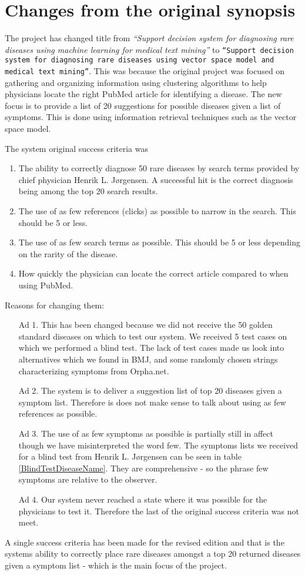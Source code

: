 \chapter*{Changes from the original synopsis}

The project has changed title from \textit{``Support decision system
  for diagnosing rare diseases using machine learning for medical text
  mining''} to \texttt{``Support decision system for diagnosing rare
  diseases using vector space model and \\ medical text
  mining''}. This was because the original project was focused on
gathering and organizing information using clustering algorithms to
help physicians locate the right PubMed article for identifying a
disease. The new focus is to provide a list of 20 suggestions for
possible diseases given a list of symptoms. This is done using
information retrieval techniques such as the vector space model.

The system original success criteria was
\begin{enumerate}
\item The ability to correctly diagnose 50 rare diseases by search
  terms provided by chief physician Henrik L. J\o rgensen. A
  successful hit is the correct diagnosis being among the top 20
  search results.
\item The use of as few references (clicks) as possible to narrow in
  the search.  This should be 5 or less.
\item The use of as few search terms as possible. This should be 5 or
  less depending on the rarity of the disease.
\item How quickly the physician can locate the correct article
  compared to when using PubMed.
\end{enumerate}

Reasons for changing them:
\begin{itemize}
\item[Ad 1.] This has been changed because we did not receive the 50 golden
standard diseases on which to test our system. We received 5 test
cases on which we performed a blind test. The lack of test cases made
us look into alternatives which we found in BMJ, and some randomly
chosen strings characterizing symptoms from Orpha.net.

\item[Ad 2.] The system is to deliver a suggestion list of top 20 diseases given a
symptom list. Therefore is does not make sense to talk about using as
few references as possible.

\item[Ad 3.] The use of as few symptoms as possible is partially still in affect
though we have misinterpreted the word few. The symptoms lists we
received for a blind test from Henrik L. J\o rgensen can be seen in
table \ref{BlindTestDiseaseName}. They are comprehensive - so the
phrase few symptoms are relative to the observer.

\item[Ad 4.] Our system never reached a state where it was possible for the
physicians to test it. Therefore the last of the original success
criteria was not meet.
\end{itemize}

A single success criteria has been made for the revised
edition and that is the systems ability to correctly place rare
diseases amongst a top 20 returned diseases given a symptom list - 
which is the main focus of the project.
